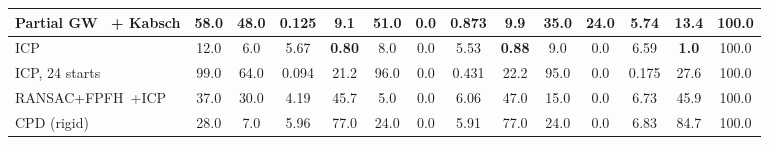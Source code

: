 \begin{table}[!t]
\begin{tabular*}{\textwidth}{@{\extracolsep{\fill}}lccccccccccccc@{}}
Partial GW~\cite{chapel2020partial} + Kabsch & 58.0 & 48.0 & 0.125 & 9.1 & 51.0 & 0.0 & 0.873 & 9.9 & 35.0 & 24.0 & 5.74 & 13.4 & 100.0 \\
\midrule
ICP~\cite{besl1992icp} & 12.0 & 6.0 & 5.67 & \textbf{0.80} & 8.0 & 0.0 & 5.53 & \textbf{0.88} & 9.0 & 0.0 & 6.59 & \textbf{1.0} & 100.0 \\
ICP, 24 starts~\cite{besl1992icp} & 99.0 & 64.0 & 0.094 & 21.2 & 96.0 & 0.0 & 0.431 & 22.2 & 95.0 & 0.0 & 0.175 & 27.6 & 100.0 \\
RANSAC+FPFH~\cite{rusu2009fpfh}+ICP & 37.0 & 30.0 & 4.19 & 45.7 & 5.0 & 0.0 & 6.06 & 47.0 & 15.0 & 0.0 & 6.73 & 45.9 & 100.0 \\
CPD (rigid)~\cite{myronenko2010cpd} & 28.0 & 7.0 & 5.96 & 77.0 & 24.0 & 0.0 & 5.91 & 77.0 & 24.0 & 0.0 & 6.83 & 84.7 & 100.0 \\
\bottomrule
\end{tabular*}
\end{table}
